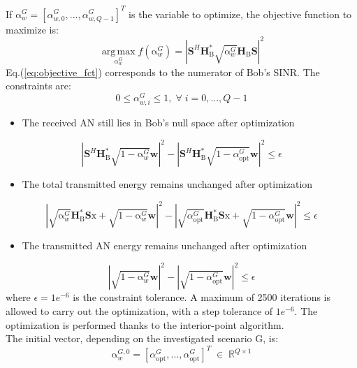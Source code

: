 \documentclass[journal,comsoc]{IEEEtran}
\newcommand{\module}[1]{\left|#1\right|}
\newcommand{\HB}{\textbf{H}_{\text{B}}}
\newcommand{\spread}{\textbf{S}}
\newcommand{\w}{\textbf{w}}
\newcommand{\mat}[1]{\boldsymbol{\mathrm{#1}}}
\begin{document}
If $\mat{\alpha}_w^G = [\alpha_{w,0}^G,...,\alpha_{w,Q-1}^G]^T$ is the variable to optimize, the objective function to maximize is:
\begin{equation}
	\operatorname*{arg\,max}_{\alpha_w^G}  f(\mat{\alpha}_w^G) = \left| \spread^H \HB^* \sqrt{\mat{\alpha}_w^G} \HB \spread \right|^2
	\label{eq:objective_fct}
\end{equation}
Eq.(\ref{eq:objective_fct}) corresponds to the numerator of Bob's SINR. The constraints are:
\begin{equation}
0 \leq \alpha_{w,i} ^G\leq 1 , \; \forall \; i = 0,...,Q-1  \label{eq:constraint1}
\end{equation}
\begin{itemize}
	\item The received AN still lies in Bob's null space after optimization
\end{itemize}
\begin{equation}
\left| \spread^H \HB^* \sqrt{\mat{1}- \mat{\alpha}_w^G} \w  \right|^2 -  \left| \spread^H \HB^* \sqrt{\mat{1}- \alpha_{\text{opt}}^G} \w  \right|^2 \leq \epsilon \label{eq:constraint2}
\end{equation}
\begin{itemize}
	\item The total transmitted energy remains unchanged after optimization
\end{itemize}
\begin{equation}
\module{\sqrt{\mat{\alpha}_w^G} \HB^* \spread \mat{x} + \sqrt{\mat{1}-\mat{\alpha}_w^G}\w }^2   - \module{\sqrt{\alpha_{\text{opt}}^G}  \HB^* \spread \mat{x} + \sqrt{1-\alpha_{\text{opt}}^G} \w }^2 \leq \epsilon \label{eq:constraint3}
\end{equation}
\begin{itemize}
	\item The transmitted AN energy remains unchanged after optimization
\end{itemize}
\begin{equation}
	\module{\sqrt{\mat{1}- \mat{\alpha}_w^G}\w}^2 - \module{\sqrt{\mat{1}- \alpha_{\text{opt}}^G}\w}^2 \leq \epsilon \label{eq:constraint4}
\end{equation}
where $\epsilon = 1e^{-6}$ is the constraint tolerance. A maximum of 2500 iterations is allowed to carry out the optimization, with a step tolerance of $1e^{-6}$. The optimization is performed thanks to the interior-point algorithm. \\
The initial vector, depending on the investigated scenario $\mat{G}$, is:
\begin{equation}
	\mat{\alpha}_w^{G,0} =\left[\alpha_{\text{opt}}^G , ... ,\alpha_{\text{opt}}^G \right]^T  \; \in \; \mathbb{R}^{Q\times 1}
\end{equation}
\end{document}
